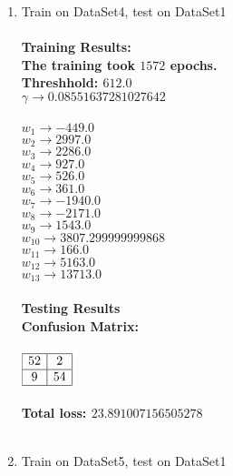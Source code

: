 \begin{enumerate}
\begin{enumerate}
				\item{Train on DataSet4, test on DataSet1} \\ \\
					\bf{Training Results: } \\
						\textnormal{The training took } \(1572\) \textnormal{ epochs. } \\
						\textnormal{Threshhold:} \( 612.0 \) \\
						\( \gamma \rightarrow 0.08551637281027642 \) \\ \\
						\( w_{1} \rightarrow -449.0 \) \\
						\( w_{2} \rightarrow 2997.0 \) \\
						\( w_{3} \rightarrow 2286.0 \) \\
						\( w_{4} \rightarrow 927.0 \) \\
						\( w_{5} \rightarrow 526.0 \) \\
						\( w_{6} \rightarrow 361.0 \) \\
						\( w_{7} \rightarrow -1940.0 \) \\
						\( w_{8} \rightarrow -2171.0 \) \\
						\( w_{9} \rightarrow 1543.0 \) \\
						\( w_{10} \rightarrow 3807.299999999868 \) \\
						\( w_{11} \rightarrow 166.0 \) \\
						\( w_{12} \rightarrow 5163.0 \) \\
						\( w_{13} \rightarrow 13713.0 \) \\ \\
					\bf{Testing Results} \\
					\textnormal{Confusion Matrix: } \\ \\
					\( 
						\begin{array}{|c|c|}
							\hline
							52 & 2 \\
							\hline							
							9 & 54 \\
							\hline
						\end{array}
					\) \\ \\
					Total loss: \(23.891007156505278\) \\ \\
				\item{Train on DataSet5, test on DataSet1} \\ \\

\end{enumerate}
\end{enumerate}
